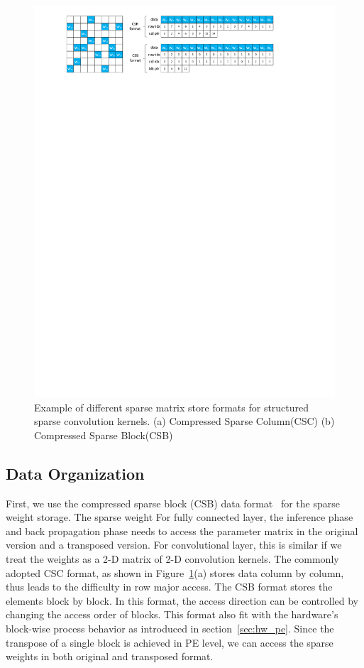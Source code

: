 \begin{figure}[htb]
  \centering
  \includegraphics[width=2.0\columnwidth]{figures/csb.pdf}
  \caption{Example of different sparse matrix store formats for structured sparse convolution kernels. (a) Compressed Sparse Column(CSC) (b) Compressed Sparse Block(CSB)}
  \label{fig:csb}
\end{figure}

\subsection{Data Organization}

First, we use the compressed sparse block (CSB) data format~\cite{bulucc2009parallel} for the sparse weight storage. The sparse weight For fully connected layer, the inference phase and back propagation phase needs to access the parameter matrix in the original version and a transposed version. For convolutional layer, this is similar if we treat the weights as a 2-D matrix of 2-D convolution kernels. The commonly adopted CSC format, as shown in Figure~\ref{fig:csb}(a) stores data column by column, thus leads to the difficulty in row major access. The CSB format stores the elements block by block. In this format, the access direction can be controlled by changing the access order of blocks. This format also fit with the hardware's block-wise process behavior as introduced in section~\ref{sec:hw_pe}. Since the transpose of a single block is achieved in PE level, we can access the sparse weights in both original and transposed format.

